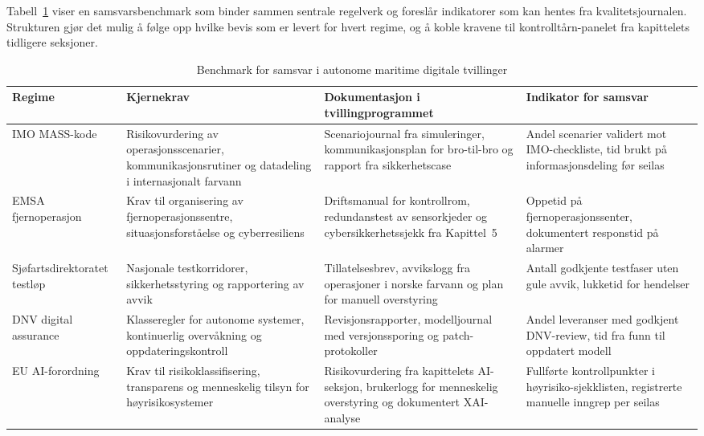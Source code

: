 Tabell~\ref{tab:maritim-benchmark} viser en samsvarsbenchmark som binder sammen sentrale regelverk og foreslår indikatorer som kan hentes fra kvalitetsjournalen. Strukturen gjør det mulig å følge opp hvilke bevis som er levert for hvert regime, og å koble kravene til kontrolltårn-panelet fra kapittelets tidligere seksjoner.

\begin{table}[ht]
    \centering
    \caption{Benchmark for samsvar i autonome maritime digitale tvillinger}
    \label{tab:maritim-benchmark}
    \begin{tabular}{|p{3.2cm}|p{4.6cm}|p{4.6cm}|p{3.0cm}|}
        \hline
        \textbf{Regime} & \textbf{Kjernekrav} & \textbf{Dokumentasjon i tvillingprogrammet} & \textbf{Indikator for samsvar} \\
        \hline
        IMO MASS-kode & Risikovurdering av operasjonsscenarier, kommunikasjonsrutiner og datadeling i internasjonalt farvann \citep{imo2023masscode} & Scenariojournal fra simuleringer, kommunikasjonsplan for bro-til-bro og rapport fra sikkerhetscase & Andel scenarier validert mot IMO-checkliste, tid brukt på informasjonsdeling før seilas \\
        \hline
        EMSA fjernoperasjon & Krav til organisering av fjernoperasjonssentre, situasjonsforståelse og cyberresiliens \citep{emsa2024remote} & Driftsmanual for kontrollrom, redundanstest av sensorkjeder og cybersikkerhetssjekk fra Kapittel~5 & Oppetid på fjernoperasjonssenter, dokumentert responstid på alarmer \citep{massterly2023operations} \\
        \hline
        Sjøfartsdirektoratet testløp & Nasjonale testkorridorer, sikkerhetsstyring og rapportering av avvik \citep{sdir2023autonomefartoy} & Tillatelsesbrev, avvikslogg fra operasjoner i norske farvann og plan for manuell overstyring & Antall godkjente testfaser uten gule avvik, lukketid for hendelser \citep{eu2022nis2} \\
        \hline
        DNV digital assurance & Klasseregler for autonome systemer, kontinuerlig overvåkning og oppdateringskontroll \citep{dnv2024autonomous,dnv2023digitalassurance} & Revisjonsrapporter, modelljournal med versjonssporing og patch-protokoller & Andel leveranser med godkjent DNV-review, tid fra funn til oppdatert modell \\
        \hline
        EU AI-forordning & Krav til risikoklassifisering, transparens og menneskelig tilsyn for høyrisikosystemer \citep{eu2023ai} & Risikovurdering fra kapittelets AI-seksjon, brukerlogg for menneskelig overstyring og dokumentert XAI-analyse & Fullførte kontrollpunkter i høyrisiko-sjekklisten, registrerte manuelle inngrep per seilas \\
        \hline
    \end{tabular}
\end{table}

